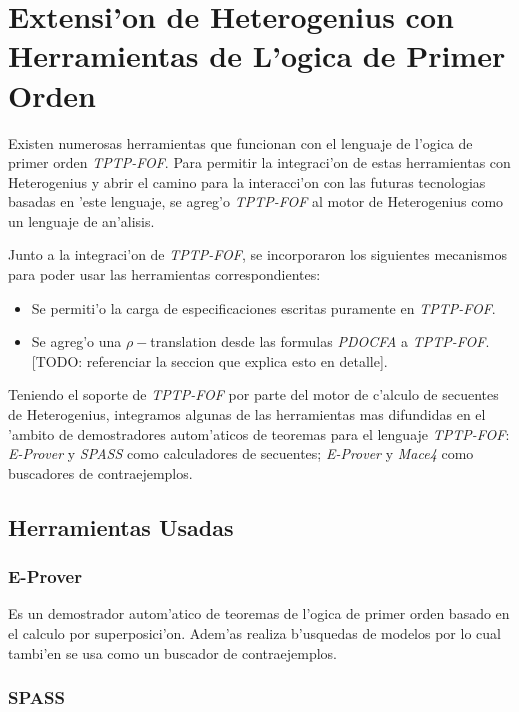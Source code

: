\section{Extensi'on de Heterogenius con Herramientas de L'ogica de Primer Orden}

Existen numerosas herramientas que funcionan con el lenguaje de l'ogica de primer orden \textit{TPTP-FOF}. Para permitir la integraci'on de estas herramientas con Heterogenius y abrir el camino para la interacci'on con las futuras tecnologias basadas en 'este lenguaje, se agreg'o \textit{TPTP-FOF} al motor de Heterogenius como un lenguaje de an'alisis.

Junto a la integraci'on de \textit{TPTP-FOF}, se incorporaron los siguientes mecanismos para poder usar las herramientas correspondientes:

\begin{itemize}
\item Se permiti'o la carga de especificaciones escritas puramente en \textit{TPTP-FOF}.

\item Se agreg'o una $\rho-$translation desde las formulas \textit{PDOCFA} a \textit{TPTP-FOF}. [TODO: referenciar la seccion que explica esto en detalle].

\end{itemize}

Teniendo el soporte de \textit{TPTP-FOF} por parte del motor de c'alculo de secuentes de Heterogenius, integramos algunas de las herramientas mas difundidas en el 'ambito de demostradores autom'aticos de teoremas para el lenguaje \textit{TPTP-FOF}: \textit{E-Prover} y \textit{SPASS} como calculadores de secuentes; \textit{E-Prover} y \textit{Mace4} como buscadores de contraejemplos.

\subsection{Herramientas Usadas}

\subsubsection{E-Prover}

Es un demostrador autom'atico de teoremas de l'ogica de primer orden basado en el calculo por superposici'on. Adem'as realiza b'usquedas de modelos por lo cual tambi'en se usa como un buscador de contraejemplos.

\subsubsection{SPASS}

